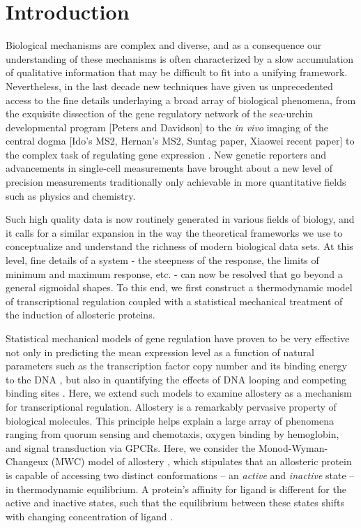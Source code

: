 \section*{Introduction}

Biological mechanisms are complex and diverse, and as a consequence our
understanding of these mechanisms is often characterized by a slow accumulation
of qualitative information that may be difficult to fit into a unifying
framework. Nevertheless, in the last decade new techniques have given us
unprecedented access to the fine details underlaying a broad array of biological
phenomena, from the exquisite dissection of the gene regulatory network of the
sea-urchin developmental program [Peters and Davidson] to the \textit{in vivo}
imaging of the central dogma [Ido's MS2, Hernan's MS2, Suntag paper, Xiaowei
recent paper] to the complex task of regulating gene expression
\cite{Garcia2011}. New genetic reporters and advancements in single-cell
measurements have brought about a new level of precision measurements
traditionally only achievable in more quantitative fields such as physics and
chemistry.

Such high quality data is now routinely generated in various fields of biology,
and it calls for a similar expansion in the way the theoretical frameworks we
use to conceptualize and understand the richness of modern biological data
sets. At this level, fine details of a system - the steepness of
the response, the limits of minimum and maximum response, etc. - can now be
resolved that go beyond a general sigmoidal shapes. To this end, we first construct a thermodynamic model of transcriptional
regulation coupled with a statistical mechanical treatment of the induction of
allosteric proteins.

Statistical mechanical models of gene regulation have proven to be very
effective not only in predicting the mean expression level as a function of
natural parameters such as the transcription factor copy number and its binding
energy to the DNA \cite{Garcia2011}, but also in quantifying the effects of DNA
looping \cite{Boedicker2013a} and competing binding sites \cite{Brewster2014}.
Here, we extend such models to examine allostery as a mechanism for
transcriptional regulation. Allostery is a remarkably pervasive property of
biological molecules. This principle helps explain a large array of phenomena
ranging from quorum sensing and chemotaxis, oxygen binding by hemoglobin, and
signal  transduction via GPCRs. Here, we consider the Monod-Wyman-Changeux
(MWC) model of allostery \cite{MONOD1965}, which stipulates that an allosteric
protein is capable of accessing two distinct conformations -- an
\textit{active} and \textit{inactive} state -- in thermodynamic equilibrium. A
protein's affinity for ligand is different for the active and inactive states,
such that the equilibrium between these states shifts with changing
concentration of ligand \cite{Marzen2013}.


